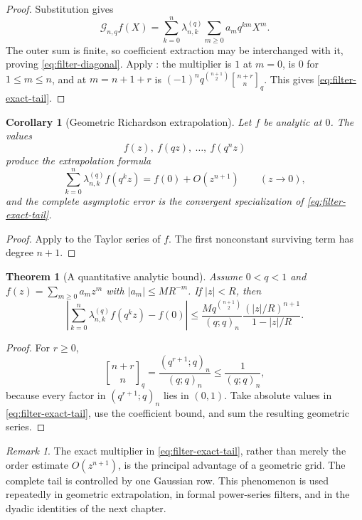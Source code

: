 \documentclass[11pt,oneside,openany]{book}
\newtheorem{theorem}{Theorem}[chapter]
\newtheorem{corollary}[corollary]{Corollary}
\theoremstyle{definition}
\theoremstyle{remark}
\newtheorem{remark}[remark]{Remark}
\newcommand{\Qbinom}[3]{\genfrac{[}{]}{0pt}{}{#1}{#2}_{#3}}
\newcommand{\abs}[1]{\lvert #1\rvert}
\begin{document}
\begin{proof}
Substitution gives
\[
 \mathcal G_{n,q}f(X)
 =\sum_{k=0}^{n}\lambda_{n,k}^{(q)}
   \sum_{m\ge0}a_mq^{km}X^m.
\]
The outer sum is finite, so coefficient extraction may be interchanged with it, proving \eqref{eq:filter-diagonal}.  Apply : the multiplier is $1$ at $m=0$, is $0$ for $1\le m\le n$, and at $m=n+1+r$ is
$(-1)^nq^{\binom{n+1}{2}}\Qbinom{n+r}{n}{q}$.  This gives \eqref{eq:filter-exact-tail}.
\end{proof}

\begin{corollary}[Geometric Richardson extrapolation]\label{cor:geometric-richardson}
Let $f$ be analytic at $0$.  The values
\[
 f(z),\ f(qz),\ \ldots,\ f(q^nz)
\]
produce the extrapolation formula
\[
 \sum_{k=0}^{n}\lambda_{n,k}^{(q)}f(q^kz)
 =f(0)+O(z^{n+1})
 \qquad(z\to0),
\]
and the complete asymptotic error is the convergent specialization of
\eqref{eq:filter-exact-tail}.
\end{corollary}

\begin{proof}
Apply  to the Taylor series of $f$.  The first nonconstant surviving term has degree $n+1$.
\end{proof}

\begin{theorem}[A quantitative analytic bound]\label{thm:geometric-filter-bound}
Assume $0<q<1$ and
$f(z)=\sum_{m\ge0}a_mz^m$ with
$\abs{a_m}\le M R^{-m}$.  If $\abs z<R$, then
\begin{equation}\label{eq:geometric-filter-bound}
 \left|\sum_{k=0}^{n}\lambda_{n,k}^{(q)}f(q^kz)-f(0)\right|
 \le
 \frac{M q^{\binom{n+1}{2}}}{(q;q)_n}
 \frac{(\abs z/R)^{n+1}}{1-\abs z/R}.
\end{equation}
\end{theorem}

\begin{proof}
For $r\ge0$,
\[
 \Qbinom{n+r}{n}{q}
 =\frac{(q^{r+1};q)_n}{(q;q)_n}
 \le\frac1{(q;q)_n},
\]
because every factor in $(q^{r+1};q)_n$ lies in $(0,1)$.  Take absolute values in \eqref{eq:filter-exact-tail}, use the coefficient bound, and sum the resulting geometric series.
\end{proof}

\begin{remark}
The exact multiplier in \eqref{eq:filter-exact-tail}, rather than merely the order estimate $O(z^{n+1})$, is the principal advantage of a geometric grid.  The complete tail is controlled by one Gaussian row.  This phenomenon is used repeatedly in geometric extrapolation, in formal power-series filters, and in the dyadic identities of the next chapter.
\end{remark}
\end{document}
